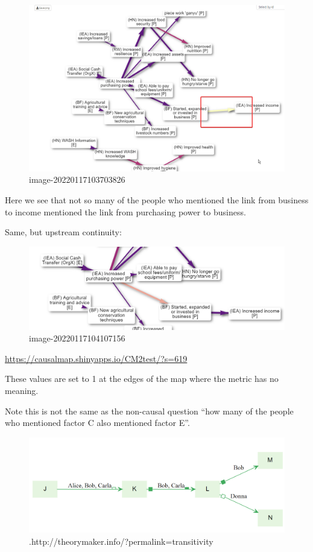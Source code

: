 \documentclass[
]{book}
\begin{document}
\begin{figure}
\centering
\includegraphics[width=6.77083in,height=\textheight]{_assets/image-20220117103703826.png}
\caption{image-20220117103703826}
\end{figure}

Here we see that not so many of the people who mentioned the link from business to income mentioned the link from purchasing power to business.

Same, but upstream continuity:

\begin{figure}
\centering
\includegraphics[width=6.77083in,height=\textheight]{_assets/image-20220117104107156.png}
\caption{image-20220117104107156}
\end{figure}

\url{https://causalmap.shinyapps.io/CM2test/?s=619}

These values are set to 1 at the edges of the map where the metric has no meaning.

Note this is not the same as the non-causal question ``how many of the people who mentioned factor C also mentioned factor E''.

\begin{figure}
\centering
\includegraphics[width=6.77083in,height=\textheight]{_assets/image-20211222121147473.png}
\caption{.http://theorymaker.info/?permalink=transitivity}
\end{figure}
\end{document}
